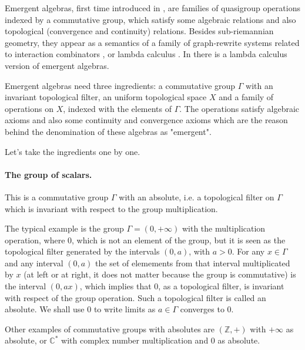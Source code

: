 \documentclass{article}
\begin{document}
Emergent algebras, first time introduced in \cite{buligairq},  are families of quasigroup operations indexed by a commutative group, which satisfy some algebraic relations and also topological (convergence and continuity) relations. Besides sub-riemannian geometry, they appear as a semantics of a family of graph-rewrite systems related to interaction combinators \cite{buligahis}, or lambda calculus \cite{buligaglc}. In \cite{buligaem} there is a lambda calculus version of emergent algebras. 

Emergent algebras need three ingredients: a commutative group $\Gamma$ with an invariant topological filter, 
an uniform topological space $X$ and a family of operations on $X$, indexed with the elements of $\Gamma$.  The operations satisfy algebraic axioms and also some continuity and convergence axioms which are the reason behind the denomination of these algebras as "emergent". 

Let's take the ingredients one by one. 


\paragraph{The group of scalars.} This is a commutative group $\Gamma$ with an absolute, i.e. a topological filter on $\Gamma$ which is invariant with respect to the group multiplication. 

 The typical example is the group $\Gamma = (0,+\infty)$ with the  multiplication operation, where $0$, which is not an element of the group, but it is seen as the topological filter generated by the intervals $(0,a)$, with $a >0$. 
For any $x \in \Gamma$ and any interval $(0,a)$ the set of elemements from that interval multiplicated by $x$ (at left or at right, it does not matter because the group is commutative) is the interval $(0,ax)$, which implies that $0$, as a topological filter, is invariant with respect of the group operation. Such a topological filter is called an absolute. We shall use $0$ to write limits as $a \in \Gamma$ converges to $0$. 

Other examples of commutative groups with absolutes are $(\mathbb{Z},+)$ with $+\infty$ as absolute, or $\displaystyle \mathbb{C}^{*}$  with complex number multiplication and $0$ as absolute. 
\end{document}
